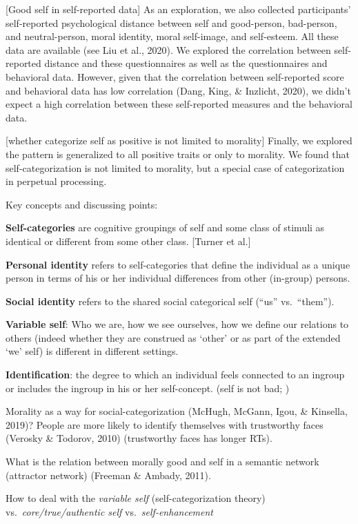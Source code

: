 \documentclass[
  english,
  man]{apa6}
\begin{document}
{[}Good self in self-reported data{]} As an exploration, we also collected participants' self-reported psychological distance between self and good-person, bad-person, and neutral-person, moral identity, moral self-image, and self-esteem. All these data are available (see Liu et al., 2020). We explored the correlation between self-reported distance and these questionnaires as well as the questionnaires and behavioral data. However, given that the correlation between self-reported score and behavioral data has low correlation (Dang, King, \& Inzlicht, 2020), we didn't expect a high correlation between these self-reported measures and the behavioral data.

{[}whether categorize self as positive is not limited to morality{]} Finally, we explored the pattern is generalized to all positive traits or only to morality. We found that self-categorization is not limited to morality, but a special case of categorization in perpetual processing.

Key concepts and discussing points:

\textbf{Self-categories} are cognitive groupings of self and some class of stimuli as identical or different from some other class. {[}Turner et al.{]}

\textbf{Personal identity} refers to self-categories that define the individual as a unique person in terms of his or her individual differences from other (in-group) persons.

\textbf{Social identity} refers to the shared social categorical self (``us'' vs.~``them'').

\textbf{Variable self}: Who we are, how we see ourselves, how we define our relations to others (indeed whether they are construed as `other' or as part of the extended `we' self) is different in different settings.

\textbf{Identification}: the degree to which an individual feels connected to an ingroup or includes the ingroup in his or her self-concept. (self is not bad; )

Morality as a way for social-categorization (McHugh, McGann, Igou, \& Kinsella, 2019)? People are more likely to identify themselves with trustworthy faces (Verosky \& Todorov, 2010) (trustworthy faces has longer RTs).

What is the relation between morally good and self in a semantic network (attractor network) (Freeman \& Ambady, 2011).

How to deal with the \emph{variable self} (self-categorization theory) vs.~\emph{core/true/authentic self} vs.~\emph{self-enhancement}
\end{document}
